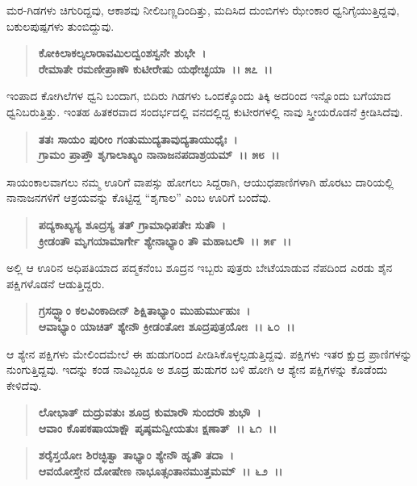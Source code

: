 ಮರ-ಗಿಡಗಳು ಚಿಗುರಿದ್ದವು, ಆಕಾಶವು ನೀಲಿಬಣ್ಣದಿಂದಿತ್ತು, ಮದಿಸಿದ ದುಂಬಿಗಳು ಝೇಂಕಾರ ಧ್ವನಿಗೈಯುತ್ತಿದ್ದವು, ಬಕುಲಪುಷ್ಪಗಳು ತುಂಬಿದ್ದುವು.

\begin{verse}
\textbf{ಕೋಕಿಲಾಕಲ್ಕಲಾರಾವಮಿಲದ್ವಂಶಸ್ವನೇ ಶುಭೇ~।}\\\textbf{ರೇಮಾತೇ ರಮಣೀಪ್ರಾಣೌ ಕುಟೀರೇಷು ಯಥೇಚ್ಛಯಾ~।। ೫೭~।। }
\end{verse}

ಇಂಪಾದ ಕೋಗಿಲೆಗಳ ಧ್ವನಿ ಬಂದಾಗ, ಬಿದಿರು ಗಿಡಗಳು ಒಂದಕ್ಕೊಂದು ತಿಕ್ಕಿ ಅದರಿಂದ ಇನ್ನೊಂದು ಬಗೆಯಾದ ಧ್ವನಿಬರುತ್ತಿತ್ತು. ಇಂತಹ ಹಿತಕರವಾದ ಸಂದರ್ಭದಲ್ಲಿ ವನದಲ್ಲಿದ್ದ ಕುಟೀರಗಳಲ್ಲಿ ನಾವು ಸ್ತ್ರೀಯರೊಡನೆ ಕ್ರೀಡಿಸಿದೆವು.

\begin{verse}
\textbf{ತತಃ ಸಾಯಂ ಪುರೀಂ ಗಂತುಮುದ್ಯತಾವುದ್ಯತಾಯುಧೈಃ~।}\\\textbf{ಗ್ರಾಮಂ ಪ್ರಾಪ್ತೌ ಶೃಗಾಲಾಖ್ಯಂ ನಾನಾಜನಪದಾಶ್ರಯಮ್~।। ೫೮~।। }
\end{verse}

ಸಾಯಂಕಾಲವಾಗಲು ನಮ್ಮ ಊರಿಗೆ ವಾಪಸ್ಸು ಹೋಗಲು ಸಿದ್ದರಾಗಿ, ಆಯುಧಪಾಣಿಗಳಾಗಿ ಹೊರಟು ದಾರಿಯಲ್ಲಿ ನಾನಾಜನಗಳಿಗೆ ಆಶ್ರಯವನ್ನು ಕೊಟ್ಟಿದ್ದ “ಶೃಗಾಲ” ಎಂಬ ಊರಿಗೆ ಬಂದೆವು.

\begin{verse}
\textbf{ಪದ್ಯಕಾಖ್ಯಸ್ಯ ಶೂದ್ರಸ್ಯ ತತ್ ಗ್ರಾಮಾಧಿಪತೇಃ ಸುತೌ~।}\\\textbf{ಕ್ರೀಡಂತೌ ಮೃಗಯಾಮಾರ್ಗೇ ಶ್ಯೇನಾಭ್ಯಾಂ ತೌ ಮಹಾಬಲೌ~।। ೫೯~।।}
\end{verse}

ಅಲ್ಲಿ ಆ ಊರಿನ ಅಧಿಪತಿಯಾದ ಪದ್ಮಕನೆಂಬ ಶೂದ್ರನ ಇಬ್ಬರು ಪುತ್ರರು ಬೇಟೆಯಾಡುವ ನೆಪದಿಂದ ಎರಡು ಶೈನ ಪಕ್ಷಿಗಳೊಡನೆ ಆಡುತ್ತಿದ್ದರು.

\begin{verse}
\textbf{ಗ್ರಸದ್ಭ್ಯಾಂ ಕಲವಿಂಕಾದೀನ್ ಶಿಕ್ಷಿತಾಭ್ಯಾಂ ಮುಹುರ್ಮುಹುಃ~।}\\\textbf{ಆವಾಭ್ಯಾಂ ಯಾಚಿತ್ ಶ್ಯೇನೌ ಕ್ರೀಡಂತೋಃ ಶೂದ್ರಪುತ್ರಯೋಃ~।। ೬೦~।।}
\end{verse}

ಆ ಶ್ಯೇನ ಪಕ್ಷಿಗಳು ಮೇಲಿಂದಮೇಲೆ ಈ ಹುಡುಗರಿಂದ ಪೀಡಿಸಿಕೊಳ್ಳಲ್ಪಡುತ್ತಿದ್ದವು. ಪಕ್ಷಿಗಳು ಇತರ ಕ್ಷುದ್ರ ಪ್ರಾಣಿಗಳನ್ನು ನುಂಗುತ್ತಿದ್ದವು. ಇದನ್ನು ಕಂಡ ನಾವಿಬ್ಬರೂ ಅ ಶೂದ್ರ ಹುಡುಗರ ಬಳಿ ಹೋಗಿ ಆ ಶ್ಯೇನ ಪಕ್ಷಿಗಳನ್ನು ಕೊಡೆಂದು ಕೇಳಿದೆವು.

\begin{verse}
\textbf{ಲೋಭಾತ್ ದುದ್ರುವತುಃ ಶೂದ್ರ ಕುಮಾರೌ ಸುಂದರೌ ಶುಭೌ~।}\\\textbf{ಆವಾಂ ಕೊಪಕಷಾಯಾಕ್ಷೌ ಪೃಷ್ಠಮನ್ವೀಯತುಃ ಕ್ಷಣಾತ್~।। ೬೧~।।} 
\end{verse}

\begin{verse}
\textbf{ಶರೈಸ್ತಯೋಃ ಶಿರಚ್ಛಿತ್ವಾ ತಾಭ್ಯಾಂ ಶ್ಯೇನೌ ಹೃತೌ ತದಾ~।}\\\textbf{ಆವಯೋಸ್ತೇನ ದೋಷೇಣ ನಾಭೂತ್ಸಂತಾನಮುತ್ತಮಮ್~।। ೬೨~।।}
\end{verse}

